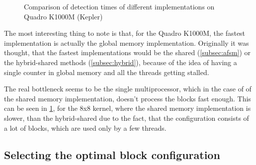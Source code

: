 \begin{figure}[ht]
	\label{fig:quadro-det-measurement}
\centering{}
	\caption{Comparison of detection times of different implementations on Quadro K1000M (Kepler)}
\end{figure}

The most interesting thing to note is that, for the Quadro K1000M, the fastest implementation is actually the global memory implementation. Originally it was thought, that the fastest implementations would be the shared (\ref{subsec:afsm}) or the hybrid-shared methods (\ref{subsec:hybrid}), because of the idea of having a single counter in global memory and all the threads getting stalled. 

The real bottleneck seems to be the single multiprocessor, which in the case of of the shared memory implementation, doesn't process the blocks fast enough. This can be seen in \ref{fig:quadro-det-measurement}, for the 8x8 kernel, where the shared memory implementation is slower, than the hybrid-shared due to the fact, that the configuration consists of a lot of blocks, which are used only by a few threads.

\subsection{Selecting the optimal block configuration}\label{subsec:block-config}

